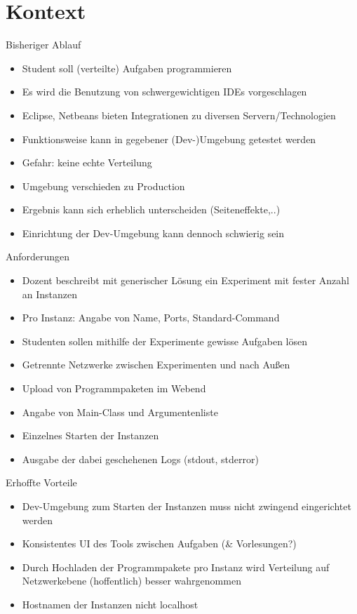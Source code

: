 \documentclass[compress]{beamer}
\begin{document}
\section{Kontext}
\begin{frame}{Bisheriger Ablauf}
  \begin{itemize}
    \item Student soll (verteilte) Aufgaben programmieren
    \item Es wird die Benutzung von schwergewichtigen IDEs vorgeschlagen
    \item Eclipse, Netbeans bieten Integrationen zu diversen Servern/Technologien
    \item Funktionsweise kann in gegebener (Dev-)Umgebung getestet werden
  \end{itemize}
  \begin{itemize}
    \item Gefahr: keine echte Verteilung
    \item Umgebung verschieden zu Production
    \item Ergebnis kann sich erheblich unterscheiden (Seiteneffekte,..)
    \item Einrichtung der Dev-Umgebung kann dennoch schwierig sein
  \end{itemize}
\end{frame}
\begin{frame}{Anforderungen}
  \begin{itemize}
    \item Dozent beschreibt mit generischer Lösung ein Experiment mit fester Anzahl an Instanzen
    \item Pro Instanz: Angabe von Name, Ports, Standard-Command
    \item Studenten sollen mithilfe der Experimente gewisse Aufgaben lösen
    \item Getrennte Netzwerke zwischen Experimenten und nach Außen
    \item Upload von Programmpaketen im Webend
    \item Angabe von Main-Class und Argumentenliste
    \item Einzelnes Starten der Instanzen
    \item Ausgabe der dabei geschehenen Logs (stdout, stderror)
  \end{itemize}
\end{frame}
\begin{frame}{Erhoffte Vorteile}
  \begin{itemize}
    \item Dev-Umgebung zum Starten der Instanzen muss nicht zwingend eingerichtet werden
    \item Konsistentes UI des Tools zwischen Aufgaben \break (\& Vorlesungen?)
    \item Durch Hochladen der Programmpakete pro Instanz wird Verteilung auf Netzwerkebene (hoffentlich) besser wahrgenommen
    \item Hostnamen der Instanzen nicht localhost
  \end{itemize}
\end{frame}
\end{document}
